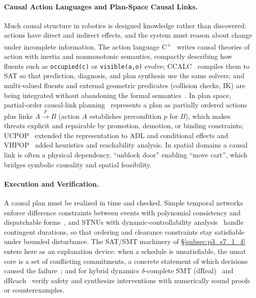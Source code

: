 \paragraph{Causal Action Languages and Plan-Space Causal Links.}
Much causal structure in robotics is designed knowledge rather than discovered: actions have direct and indirect effects, and the system must reason about change under incomplete information. The action language C\textsuperscript{+}~\cite{Giunchiglia2004CPlus} writes causal theories of action with inertia and nonmonotonic semantics, compactly describing how fluents such as \texttt{occupied(c)} or \texttt{visible(a,o)} evolve; CCALC~\cite{Lifschitz2000CCalc} compiles them to SAT so that prediction, diagnosis, and plan synthesis use the same solvers; and multi-valued fluents and external geometric predicates (collision checks, IK) are being integrated without abandoning the formal semantics~\cite{giunchiglia2023causal}. In plan space, partial-order causal-link planning~\cite{McAllester1991SNLP} represents a plan as partially ordered actions plus links $A \xrightarrow{p} B$ (action $A$ establishes precondition $p$ for $B$), which makes threats explicit and repairable by promotion, demotion, or binding constraints; UCPOP~\cite{Penberthy1992UCPOP} extended the representation to ADL and conditional effects and VHPOP~\cite{Younes2004VHPOP} added heuristics and reachability analysis. In spatial domains a causal link is often a physical dependency, ``unblock door'' enabling ``move cart'', which bridges symbolic causality and spatial feasibility.

\paragraph{Execution and Verification.}
A causal plan must be realized in time and checked. Simple temporal networks~\cite{Dechter1991STN} enforce difference constraints between events with polynomial consistency and dispatchable forms~\cite{Tsamardinos1998Dispatch}, and STNUs with dynamic-controllability analysis~\cite{Morris2001STNU} handle contingent durations, so that ordering and clearance constraints stay satisfiable under bounded disturbance. The SAT/SMT machinery of §\ref{subsec:p3_s7_1_4} enters here as an explanation device: when a schedule is unsatisfiable, the unsat core is a set of conflicting commitments, a concrete statement of which decisions caused the failure~\cite{Surynek2016SATMAPF,Yu2016OptimalMAPF}; and for hybrid dynamics $\delta$-complete SMT (dReal)~\cite{Gao2013dReal} and dReach~\cite{Kong2015dReach} verify safety and synthesize interventions with numerically sound proofs or counterexamples.

